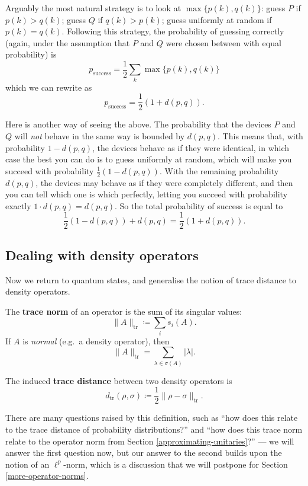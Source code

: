 \documentclass[fleqn]{article}
\newenvironment{idea}{\noindent}{\medskip}
\begin{document}
Arguably the most natural strategy is to look at \(\max\{p(k),q(k)\}\): guess \(P\) if \(p(k)>q(k)\); guess \(Q\) if \(q(k)>p(k)\); guess uniformly at random if \(p(k)=q(k)\).
Following this strategy, the probability of guessing correctly (again, under the assumption that \(P\) and \(Q\) were chosen between with equal probability) is
\[
  p_{\mathrm{success}} = \frac{1}{2}\sum_k \max\{p(k),q(k)\}
\]
which we can rewrite as
\[
  p_{\mathrm{success}} = \frac{1}{2}(1+d(p,q)).
\]

Here is another way of seeing the above.
The probability that the devices \(P\) and \(Q\) will \emph{not} behave in the same way is bounded by \(d(p,q)\).
This means that, with probability \(1-d(p,q)\), the devices behave as if they were identical, in which case the best you can do is to guess uniformly at random, which will make you succeed with probability \(\frac{1}{2}(1-d(p,q))\).
With the remaining probability \(d(p,q)\), the devices may behave as if they were completely different, and then you can tell which one is which perfectly, letting you succeed with probability exactly \(1\cdot d(p,q)=d(p,q)\).
So the total probability of success is equal to
\[
  \frac{1}{2}(1-d(p,q)) + d(p,q)
  = \frac{1}{2}(1+d(p,q)).
\]

\hypertarget{dealing-with-density-operators}{%
\subsection{Dealing with density operators}\label{dealing-with-density-operators}}

Now we return to quantum states, and generalise the notion of trace distance to density operators.

\begin{idea}
The \textbf{trace norm} of an operator is the sum of its singular values:
\[
  \|A\|_{\operatorname{tr}} \coloneqq \sum_i s_i(A).
\]
If \(A\) is \emph{normal} (e.g.~a density operator), then
\[
  \|A\|_{\operatorname{tr}} = \sum_{\lambda\in\sigma(A)} |\lambda|.
\]

The induced \textbf{trace distance} between two density operators is
\[
  d_{\operatorname{tr}}(\rho,\sigma) \coloneqq \frac{1}{2}\|\rho-\sigma\|_{\operatorname{tr}}.
\]

\end{idea}

There are many questions raised by this definition, such as ``how does this relate to the trace distance of probability distributions?'' and ``how does this trace norm relate to the operator norm from Section \ref{approximating-unitaries}?'' --- we will answer the first question now, but our answer to the second builds upon the notion of an \(\ell^p\)-norm, which is a discussion that we will postpone for Section \ref{more-operator-norms}.
\end{document}
